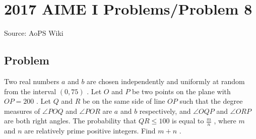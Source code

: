 \documentclass[12pt]{article}
\begin{document}
\section*{{2017 AIME I Problems/Problem 8}}
Source: AoPS Wiki

\subsection*{Problem}
Two real numbers $a$ and $b$ are chosen independently and uniformly at random from the interval $(0, 75)$ . Let $O$ and $P$ be two points on the plane with $OP = 200$ . Let $Q$ and $R$ be on the same side of line $OP$ such that the degree measures of $\angle POQ$ and $\angle POR$ are $a$ and $b$ respectively, and $\angle OQP$ and $\angle ORP$ are both right angles. The probability that $QR \leq 100$ is equal to $\frac{m}{n}$ , where $m$ and $n$ are relatively prime positive integers. Find $m + n$ .
\end{document}
